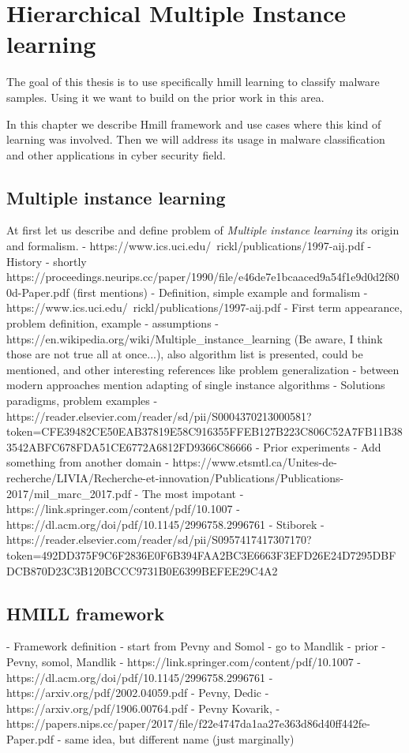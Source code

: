 \chapter{Hierarchical Multiple Instance learning}
The goal of this thesis is to use specifically hmill learning to classify malware samples. Using it we want to  build on the prior work in this area. 

In this chapter we describe Hmill framework and use cases where this kind of learning was involved. Then we will address its usage in malware classification and other applications in cyber security field.

\section{Multiple instance learning}
At first let us describe and define problem of \emph{Multiple instance learning} its origin and formalism.
- https://www.ics.uci.edu/~rickl/publications/1997-aij.pdf
- History - shortly https://proceedings.neurips.cc/paper/1990/file/e46de7e1bcaaced9a54f1e9d0d2f800d-Paper.pdf (first mentions)
- Definition, simple example and formalism
    - https://www.ics.uci.edu/~rickl/publications/1997-aij.pdf - First term appearance, problem definition, example
    - assumptions - https://en.wikipedia.org/wiki/Multiple_instance_learning (Be aware, I think those are not true all at once...), also algorithm list is presented, could be mentioned, and other interesting references like problem generalization
        - between modern approaches mention adapting of single instance algorithms
    - Solutions paradigms, problem examples - https://reader.elsevier.com/reader/sd/pii/S0004370213000581?token=CFE39482CE50EAB37819E58C916355FFEB127B223C806C52A7FB11B383542ABFC678FDA51CE6772A6812FD9366C86666
- Prior experiments
    - Add something from another domain
    - https://www.etsmtl.ca/Unites-de-recherche/LIVIA/Recherche-et-innovation/Publications/Publications-2017/mil_marc_2017.pdf
    - The most impotant
        - https://link.springer.com/content/pdf/10.1007%
        - https://dl.acm.org/doi/pdf/10.1145/2996758.2996761
        - Stiborek - https://reader.elsevier.com/reader/sd/pii/S0957417417307170?token=492DD375F9C6F2836E0F6B394FAA2BC3E6663F3EFD26E24D7295DBFDCB870D23C3B120BCCC9731B0E6399BEFEE29C4A2


\section{HMILL framework}
- Framework definition
    - start from Pevny and Somol
    - go to Mandlik
- prior
    - Pevny, somol, Mandlik
        - https://link.springer.com/content/pdf/10.1007%
        - https://dl.acm.org/doi/pdf/10.1145/2996758.2996761
    - https://arxiv.org/pdf/2002.04059.pdf - Pevny, Dedic
    - https://arxiv.org/pdf/1906.00764.pdf - Pevny Kovarik, 
    - https://papers.nips.cc/paper/2017/file/f22e4747da1aa27e363d86d40ff442fe-Paper.pdf - same idea, but different name (just marginally)


